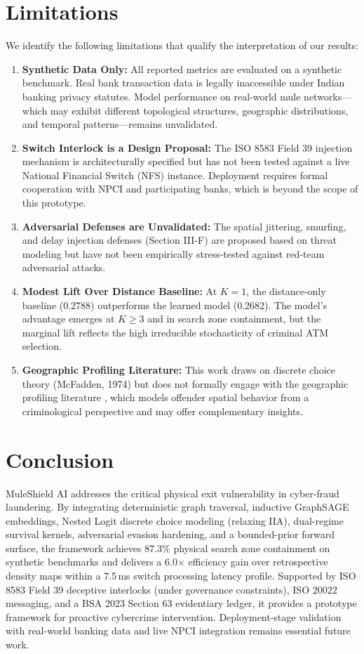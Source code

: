 \documentclass[conference]{IEEEtran}
\begin{document}
\section{Limitations}
We identify the following limitations that qualify the interpretation of our results:
\begin{enumerate}
    \item \textbf{Synthetic Data Only:} All reported metrics are evaluated on a synthetic benchmark. Real bank transaction data is legally inaccessible under Indian banking privacy statutes. Model performance on real-world mule networks---which may exhibit different topological structures, geographic distributions, and temporal patterns---remains unvalidated.
    \item \textbf{Switch Interlock is a Design Proposal:} The ISO 8583 Field 39 injection mechanism is architecturally specified but has not been tested against a live National Financial Switch (NFS) instance. Deployment requires formal cooperation with NPCI and participating banks, which is beyond the scope of this prototype.
    \item \textbf{Adversarial Defenses are Unvalidated:} The spatial jittering, smurfing, and delay injection defenses (Section III-F) are proposed based on threat modeling but have not been empirically stress-tested against red-team adversarial attacks.
    \item \textbf{Modest Lift Over Distance Baseline:} At $K=1$, the distance-only baseline (0.2788) outperforms the learned model (0.2682). The model's advantage emerges at $K \ge 3$ and in search zone containment, but the marginal lift reflects the high irreducible stochasticity of criminal ATM selection.
    \item \textbf{Geographic Profiling Literature:} This work draws on discrete choice theory (McFadden, 1974) but does not formally engage with the geographic profiling literature \cite{rossmo2000, canter1993}, which models offender spatial behavior from a criminological perspective and may offer complementary insights.
\end{enumerate}

\section{Conclusion}
MuleShield AI addresses the critical physical exit vulnerability in cyber-fraud laundering. By integrating deterministic graph traversal, inductive GraphSAGE embeddings, Nested Logit discrete choice modeling (relaxing IIA), dual-regime survival kernels, adversarial evasion hardening, and a bounded-prior forward surface, the framework achieves 87.3\% physical search zone containment on synthetic benchmarks and delivers a 6.0$\times$ efficiency gain over retrospective density maps within a 7.5\,ms switch processing latency profile. Supported by ISO 8583 Field 39 deceptive interlocks (under governance constraints), ISO 20022 messaging, and a BSA 2023 Section 63 evidentiary ledger, it provides a prototype framework for proactive cybercrime intervention. Deployment-stage validation with real-world banking data and live NPCI integration remains essential future work.
\end{document}

